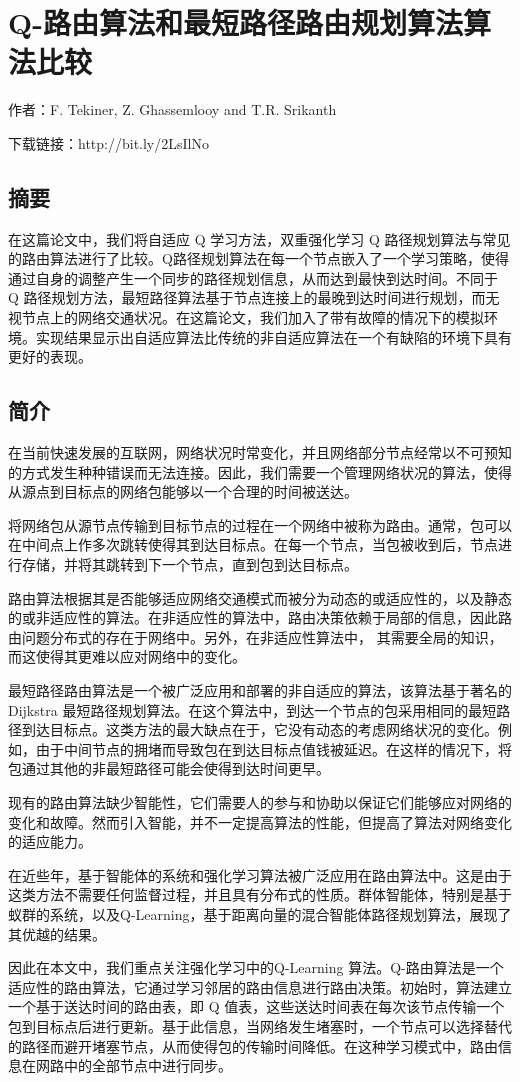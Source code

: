 \documentclass{standalone}
\begin{document}
\thesistranslationchinese

\section*{Q-路由算法和最短路径路由规划算法算法比较}
作者：F. Tekiner, Z. Ghassemlooy and T.R. Srikanth\par
下载链接：http://bit.ly/2LsIlNo
\subsection*{摘要}
在这篇论文中，我们将自适应 Q 学习方法，双重强化学习 Q 路径规划算法与常见的路由算法进行了比较。Q路径规划算法在每一个节点嵌入了一个学习策略，使得通过自身的调整产生一个同步的路径规划信息，从而达到最快到达时间。不同于 Q 路径规划方法，最短路径算法基于节点连接上的最晚到达时间进行规划，而无视节点上的网络交通状况。在这篇论文，我们加入了带有故障的情况下的模拟环境。实现结果显示出自适应算法比传统的非自适应算法在一个有缺陷的环境下具有更好的表现。
\subsection*{简介}
在当前快速发展的互联网，网络状况时常变化，并且网络部分节点经常以不可预知的方式发生种种错误而无法连接。因此，我们需要一个管理网络状况的算法，使得从源点到目标点的网络包能够以一个合理的时间被送达。\par
将网络包从源节点传输到目标节点的过程在一个网络中被称为路由。通常，包可以在中间点上作多次跳转使得其到达目标点。在每一个节点，当包被收到后，节点进行存储，并将其跳转到下一个节点，直到包到达目标点。\par
路由算法根据其是否能够适应网络交通模式而被分为动态的或适应性的，以及静态的或非适应性的算法。在非适应性的算法中，路由决策依赖于局部的信息，因此路由问题分布式的存在于网络中。另外，在非适应性算法中， 其需要全局的知识，而这使得其更难以应对网络中的变化。\par
最短路径路由算法是一个被广泛应用和部署的非自适应的算法，该算法基于著名的 Dijkstra 最短路径规划算法。在这个算法中，到达一个节点的包采用相同的最短路径到达目标点。这类方法的最大缺点在于，它没有动态的考虑网络状况的变化。例如，由于中间节点的拥堵而导致包在到达目标点值钱被延迟。在这样的情况下，将包通过其他的非最短路径可能会使得到达时间更早。\par
现有的路由算法缺少智能性，它们需要人的参与和协助以保证它们能够应对网络的变化和故障。然而引入智能，并不一定提高算法的性能，但提高了算法对网络变化的适应能力。\par
在近些年，基于智能体的系统和强化学习算法被广泛应用在路由算法中。这是由于这类方法不需要任何监督过程，并且具有分布式的性质。群体智能体，特别是基于蚁群的系统，以及Q-Learning，基于距离向量的混合智能体路径规划算法，展现了其优越的结果。\par
因此在本文中，我们重点关注强化学习中的Q-Learning 算法。Q-路由算法是一个适应性的路由算法，它通过学习邻居的路由信息进行路由决策。初始时，算法建立一个基于送达时间的路由表，即 Q 值表，这些送达时间表在每次该节点传输一个包到目标点后进行更新。基于此信息，当网络发生堵塞时，一个节点可以选择替代的路径而避开堵塞节点，从而使得包的传输时间降低。在这种学习模式中，路由信息在网路中的全部节点中进行同步。
\end{document}
